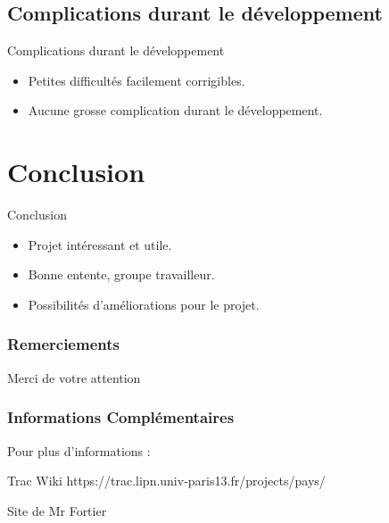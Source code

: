 \documentclass{beamer}
\begin{document}
\subsection{Complications durant le développement}

\begin{frame}{Complications durant le développement}
\begin{itemize}
  \item Petites difficultés facilement corrigibles.
  \item Aucune grosse complication durant le développement.
\end{itemize}
\end{frame}

\section*{Conclusion}

\begin{frame}{Conclusion}

  \begin{itemize}
  \item
    Projet intéressant et utile.
  \item
    Bonne entente, groupe travailleur.
  \item
    Possibilités d'améliorations pour le projet.
  \end{itemize}
  
\end{frame}

\begin{frame}
  \frametitle<presentation>{Remerciements}
	\vspace*{\fill}
	\begin{center}
	\begin{minipage}{.6\textwidth}
	\LARGE Merci de votre attention
	\end{minipage}
	\end{center}
	\vfill
\end{frame}


\begin{frame}
  \frametitle<presentation>{Informations Complémentaires}
    
     Pour plus d'informations :
  \begin{thebibliography}{10}
    
  \beamertemplateonlinebibitems

     Trac Wiki
    \newblock  https://trac.lipn.univ-paris13.fr/projects/pays/

     Site de Mr Fortier
  \end{thebibliography}
\end{frame}
\end{document}
